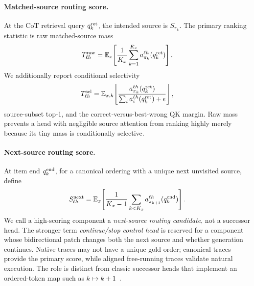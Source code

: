 \paragraph{Matched-source routing score.}
At the CoT retrieval query \(q_k^{\rm ret}\), the intended source is \(S_{\pi_k}\). The primary ranking statistic is raw matched-source mass
\begin{equation}
T_{\ell h}^{\rm raw}
=
\mathbb{E}_x\!\left[
\frac{1}{K_x}\sum_{k=1}^{K_x}
a_{\pi_k}^{\ell h}(q_k^{\rm ret})
\right].
\label{eq:target-score}
\end{equation}
We additionally report conditional selectivity
\begin{equation}
T_{\ell h}^{\rm sel}
=
\mathbb{E}_{x,k}\!\left[
\frac{a_{\pi_k}^{\ell h}(q_k^{\rm ret})}
{\sum_i a_i^{\ell h}(q_k^{\rm ret})+\epsilon}
\right],
\label{eq:target-selectivity}
\end{equation}
source-subset top-1, and the correct-versus-best-wrong QK margin. Raw mass prevents a head with negligible source attention from ranking highly merely because its tiny mass is conditionally selective.

\paragraph{Next-source routing score.}
At item end \(q_k^{\rm end}\), for a canonical ordering with a unique next unvisited source, define
\begin{equation}
S_{\ell h}^{\rm next}
=
\mathbb{E}_x\!\left[
\frac{1}{K_x-1}
\sum_{k<K_x}
a_{\pi_{k+1}}^{\ell h}(q_k^{\rm end})
\right].
\label{eq:next-score}
\end{equation}
We call a high-scoring component a \emph{next-source routing candidate}, not a successor head. The stronger term \emph{continue/stop control head} is reserved for a component whose bidirectional patch changes both the next source and whether generation continues. Native traces may not have a unique gold order; canonical traces provide the primary score, while aligned free-running traces validate natural execution. The role is distinct from classic successor heads that implement an ordered-token map such as \(k\mapsto k+1\)~\citep{gould2023successor}.

